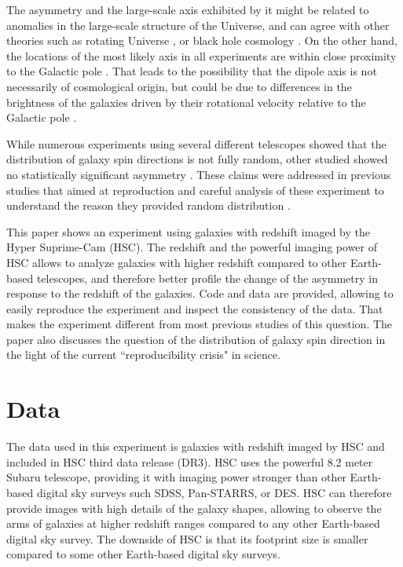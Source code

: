 \documentclass[final,5p,times,twocolumn]{article}
\begin{document}
The asymmetry and the large-scale axis exhibited by it might be related to anomalies in the large-scale structure of the Universe, and can agree with other theories such as rotating Universe \citep{godel1949example,ozsvath1962finite,ozsvath2001approaches,sivaram2012primordial,chechin2016rotation,seshavatharam2020integrated,camp2021}, or black hole cosmology \citep{pathria1972universe,easson2001universe,seshavatharam2014understanding,poplawski2010radial,tatum2018flat,christillin2014machian,seshavatharam2020light,chakrabarty2020toy}. On the other hand, the locations of the most likely axis in all experiments are within close proximity to the Galactic pole \citep{mcadam2023asymmetry}. That leads to the possibility that the dipole axis is not necessarily of cosmological origin, but could be due to differences in the brightness of the galaxies driven by their rotational velocity relative to the Galactic pole \citep{mcadam2023asymmetry,shamir2020asymmetry,shamir2017large,universe10030129}.  

While numerous experiments using several different telescopes showed that the distribution of galaxy spin directions is not fully random, other studied showed no statistically significant asymmetry \citep{iye1991catalog,land2008galaxy,hayes2017nature,iye2020spin,petal}. These claims were addressed in previous studies that aimed at reproduction and careful analysis of these experiment to understand the reason they provided random distribution \citep{shamir2023large,shamir2022analysis,shamir2024galaxy,shamir2022using,shamir2024reproducible}.

This paper shows an experiment using galaxies with redshift imaged by the Hyper Suprime-Cam (HSC). The redshift and the powerful imaging power of HSC allows to analyze galaxies with higher redshift compared to other Earth-based telescopes, and therefore better profile the change of the asymmetry in response to the redshift of the galaxies. Code and data are provided, allowing to easily reproduce the experiment and inspect the consistency of the data. That makes the experiment different from most previous studies of this question. The paper also discusses the question of the distribution of galaxy spin direction in the light of the current ``reproducibility crisis" in science.  


\section{Data}
\label{data}

The data used in this experiment is galaxies with redshift imaged by HSC and included in HSC third data release (DR3). HSC uses the powerful 8.2 meter Subaru telescope, providing it with imaging power stronger than other Earth-based digital sky surveys such SDSS, Pan-STARRS, or DES. HSC can therefore provide images with high details of the galaxy shapes, allowing to observe the arms of galaxies at higher redshift ranges compared to any other Earth-based digital sky survey. The downside of HSC is that its footprint size is smaller compared to some other Earth-based digital sky surveys. 
\end{document}
